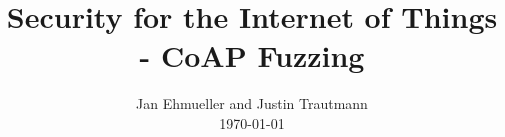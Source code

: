 \documentclass[sigconf]{acmart}
\begin{document}
\title{Security for the Internet of Things - CoAP Fuzzing}

\author{Jan Ehmueller and Justin Trautmann \\ \today}

\begin{abstract}
\end{abstract}

\maketitle

\glsresetall










\balance


\end{document}

